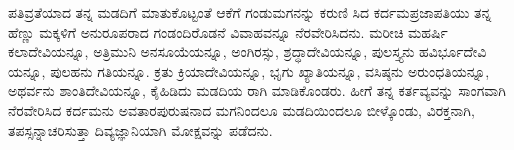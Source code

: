 ಪತಿವ್ರತೆಯಾದ ತನ್ನ ಮಡದಿಗೆ ಮಾತುಕೊಟ್ಟಂತೆ ಆಕೆಗೆ ಗಂಡುಮಗನನ್ನು ಕರುಣಿ ಸಿದ ಕರ್ದಮಪ್ರಜಾಪತಿಯು ತನ್ನ ಹೆಣ್ಣು ಮಕ್ಕಳಿಗೆ ಅನುರೂಪರಾದ ಗಂಡಂದಿರೊಡನೆ ವಿವಾಹವನ್ನೂ ನೆರವೇರಿಸಿದನು. ಮರೀಚಿ ಮಹರ್ಷಿ ಕಲಾದೇವಿಯನ್ನೂ, ಅತ್ರಿಮುನಿ ಅನಸೂಯೆಯನ್ನೂ, ಅಂಗಿರಸ್ಸು, ಶ್ರದ್ಧಾದೇವಿಯನ್ನೂ, ಪುಲಸ್ತ್ಯನು ಹವಿರ್ಭೂದೇವಿ ಯನ್ನೂ, ಪುಲಹನು ಗತಿಯನ್ನೂ. ಕ್ರತು ಕ್ರಿಯಾದೇವಿಯನ್ನೂ, ಭೃಗು ಖ್ಯಾತಿಯನ್ನೂ, ವಸಿಷ್ಠನು ಅರುಂಧತಿಯನ್ನೂ, ಅಥರ್ವನು ಶಾಂತಿದೇವಿಯನ್ನೂ, ಕೈಹಿಡಿದು ಮಡದಿಯ ರಾಗಿ ಮಾಡಿಕೊಂಡರು. ಹೀಗೆ ತನ್ನ ಕರ್ತವ್ಯವನ್ನು ಸಾಂಗವಾಗಿ ನೆರವೇರಿಸಿದ ಕರ್ದಮನು ಅವತಾರಪುರುಷನಾದ ಮಗನಿಂದಲೂ ಮಡದಿಯಿಂದಲೂ ಬೀಳ್ಕೊಂಡು, ವಿರಕ್ತನಾಗಿ, ತಪಸ್ಸನ್ನಾಚರಿಸುತ್ತಾ ದಿವ್ಯಜ್ಞಾನಿಯಾಗಿ ಮೋಕ್ಷವನ್ನು ಪಡೆದನು.


